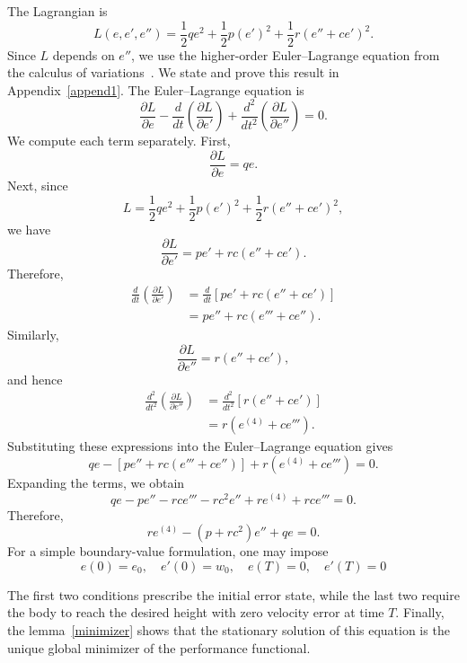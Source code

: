 ﻿\documentclass[12pt]{article}
\begin{document}
The Lagrangian is
\[
 L(e, e', e'') = \frac{1}{2}q e^2 + \frac{1}{2}p(e')^2 + \frac{1}{2}r(e'' + ce')^2.
\]
Since $L$ depends on $e''$, we use the higher-order Euler--Lagrange equation from the calculus of variations~\cite{rindler2018calculus}. We state and prove this result in Appendix~\ref{append1}. The Euler--Lagrange equation is
\[
 \frac{\partial L}{\partial e} - \frac{d}{dt}\left(\frac{\partial L}{\partial e'}\right) + \frac{d^2}{dt^2}\left(\frac{\partial L}{\partial e''}\right) = 0.
\]
We compute each term separately. First,
\[
 \frac{\partial L}{\partial e} = qe.
\]
Next, since
\[
 L = \frac{1}{2} q e^2 + \frac{1}{2} p(e')^2 + \frac{1}{2} r(e'' + ce')^2,
\]
we have
\[
 \frac{\partial L}{\partial e'} = pe' + rc(e'' + ce').
\]
Therefore,
\[
\begin{aligned}
 \frac{d}{dt}\left(\frac{\partial L}{\partial e'}\right)
 & = \frac{d}{dt} \left[ pe' + rc(e'' + ce') \right]\\
 & = pe'' + rc(e''' + ce'').
\end{aligned}
\]
Similarly,
\[
 \frac{\partial L}{\partial e''} = r(e'' + ce'),
\]
and hence
\[
\begin{aligned}
 \frac{d^2}{dt^2}\left(\frac{\partial L}{\partial e''}\right)
 & = \frac{d^2}{dt^2} \left[ r(e'' + ce')\right]\\
 & = r(e^{(4)} + ce''').
\end{aligned}
\]
Substituting these expressions into the Euler--Lagrange equation gives
\[
 qe - \left[ pe'' + rc(e''' + ce'') \right] + r(e^{(4)} + ce''') = 0.
\]
Expanding the terms, we obtain
\[
 qe - pe'' - rce''' - rc^2e'' + re^{(4)} + rce''' = 0.
\]
 Therefore,
\[
 \boxed{ re^{(4)} - (p + rc^2)e'' + qe = 0. }
\]
For a simple boundary-value formulation, one may impose
\[
 e(0) = e_0,\quad e'(0) = w_0,\quad e(T) = 0,\quad e'(T) = 0
\]

The first two conditions prescribe the initial error state, while the last two require the body to reach the desired height with zero velocity error at time $T$.
Finally, the lemma~\ref{minimizer} shows that the stationary solution of this equation is the unique global minimizer of the performance functional. 
\end{document}
